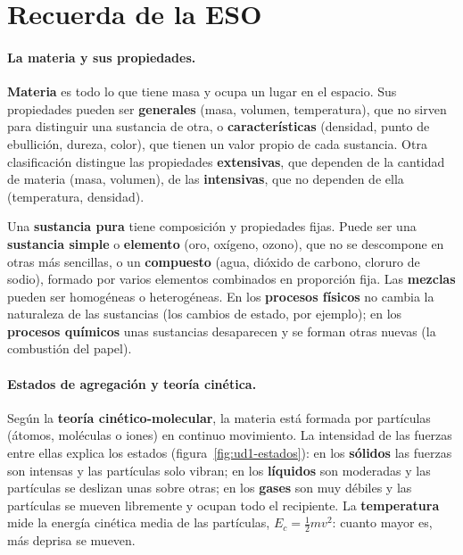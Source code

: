 \section{Recuerda de la ESO}\label{sec:ud1-eso}

\paragraph{La materia y sus propiedades.} \textbf{Materia} es todo lo que tiene masa y ocupa un lugar en el espacio. Sus
propiedades pueden ser \textbf{generales} (masa, volumen, temperatura), que no sirven para distinguir una sustancia de otra, o
\textbf{características} (densidad, punto de ebullición, dureza, color), que tienen un valor propio de cada sustancia. Otra
clasificación distingue las propiedades \textbf{extensivas}, que dependen de la cantidad de materia (masa, volumen), de las
\textbf{intensivas}, que no dependen de ella (temperatura, densidad).

Una \textbf{sustancia pura} tiene composición y propiedades fijas. Puede ser una \textbf{sustancia simple} o
\textbf{elemento} (oro, oxígeno, ozono), que no se descompone en otras más sencillas, o un \textbf{compuesto} (agua, dióxido
de carbono, cloruro de sodio), formado por varios elementos combinados en proporción fija. Las \textbf{mezclas} pueden ser
homogéneas o heterogéneas. En los \textbf{procesos físicos} no cambia la naturaleza de las sustancias (los cambios de estado,
por ejemplo); en los \textbf{procesos químicos} unas sustancias desaparecen y se forman otras nuevas (la combustión del papel).

\paragraph{Estados de agregación y teoría cinética.} Según la \textbf{teoría cinético-molecular}, la materia está formada por
partículas (átomos, moléculas o iones) en continuo movimiento. La intensidad de las fuerzas entre ellas explica los estados
(figura~\ref{fig:ud1-estados}): en los \textbf{sólidos} las fuerzas son intensas y las partículas solo vibran; en los
\textbf{líquidos} son moderadas y las partículas se deslizan unas sobre otras; en los \textbf{gases} son muy débiles y las
partículas se mueven libremente y ocupan todo el recipiente. La \textbf{temperatura} mide la energía cinética media de las
partículas, \(E_c = \frac{1}{2} m v^2\): cuanto mayor es, más deprisa se mueven.

